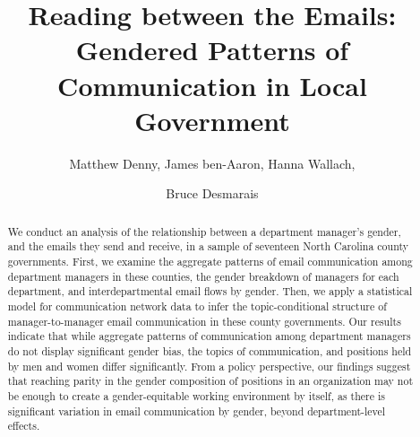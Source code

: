 \documentclass{pnastwo}
\begin{document}
\title{Reading between the Emails: Gendered Patterns of Communication in Local Government}

\author{
Matthew Denny,
James ben-Aaron,
Hanna Wallach,
\and Bruce Desmarais
}

\contributor{\vspace{-.25cm}}


\maketitle

\begin{article}
\begin{abstract}
{We conduct an analysis of the relationship between a department manager's gender, and the emails they send and receive, in a sample of seventeen North Carolina county governments. First, we examine the aggregate patterns of email communication among department managers in these counties, the gender breakdown of managers for each department, and interdepartmental email flows by gender. Then, we apply a statistical model for communication network data to infer the topic-conditional structure of manager-to-manager email communication in these county governments. Our results indicate that while aggregate patterns of communication among department managers do not display significant gender bias, the topics of communication, and positions held by men and women differ significantly. From a policy perspective, our findings suggest that reaching parity in the gender composition of positions in an organization may not be enough to create a gender-equitable working environment by itself, as there is significant variation in email communication by gender, beyond department-level effects. 
}
\end{abstract} 




\end{article}
\end{document}
